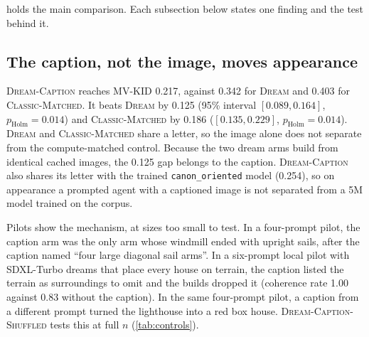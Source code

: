 
 holds the main comparison. Each subsection below states one finding and the test behind it.

\subsection{The caption, not the image, moves appearance}

\textsc{Dream-Caption} reaches MV-KID 0.217, against 0.342 for \textsc{Dream} and 0.403 for \textsc{Classic-Matched}. %
It beats \textsc{Dream} by 0.125 (95\% interval $[0.089, 0.164]$, $p_{\text{Holm}}{=}0.014$) and \textsc{Classic-Matched} by 0.186 ($[0.135, 0.229]$, $p_{\text{Holm}}{=}0.014$). %
\textsc{Dream} and \textsc{Classic-Matched} share a letter, so the image alone does not separate from the compute-matched control. %
Because the two dream arms build from identical cached images, the 0.125 gap belongs to the caption. %
\textsc{Dream-Caption} also shares its letter with the trained \texttt{canon\_oriented} model (0.254), so on appearance a prompted agent with a captioned image is not separated from a 5M model trained on the corpus. %

Pilots show the mechanism, at sizes too small to test. %
In a four-prompt pilot, the caption arm was the only arm whose windmill ended with upright sails, after the caption named ``four large diagonal sail arms''. %
In a six-prompt local pilot with SDXL-Turbo dreams that place every house on terrain, the caption listed the terrain as surroundings to omit and the builds dropped it (coherence rate 1.00 against 0.83 without the caption). %
In the same four-prompt pilot, a caption from a different prompt turned the lighthouse into a red box house. %
\textsc{Dream-Caption-Shuffled} tests this at full $n$ (\cref{tab:controls}).

